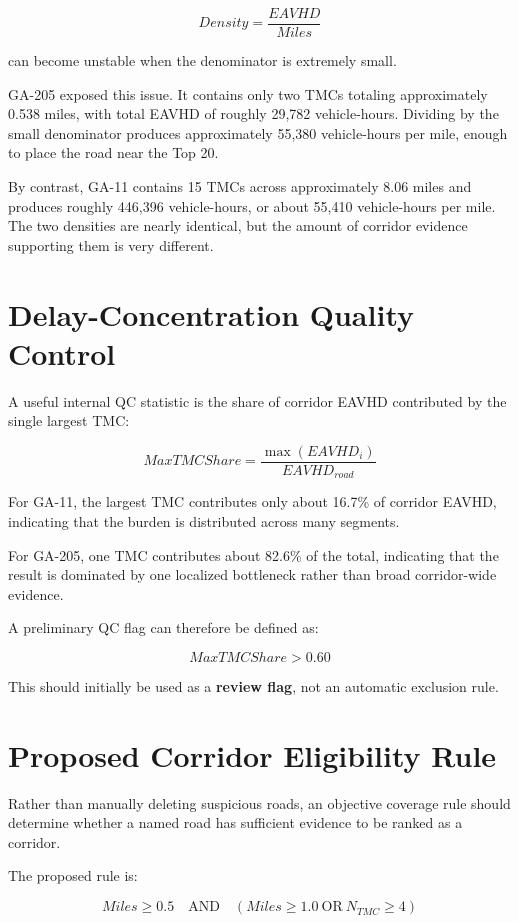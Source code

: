 \documentclass[11pt]{article}
\begin{document}
\[
Density = \frac{EAVHD}{Miles}
\]

can become unstable when the denominator is extremely small.

GA-205 exposed this issue. It contains only two TMCs totaling approximately 0.538 miles, with total EAVHD of roughly 29,782 vehicle-hours. Dividing by the small denominator produces approximately 55,380 vehicle-hours per mile, enough to place the road near the Top 20.

By contrast, GA-11 contains 15 TMCs across approximately 8.06 miles and produces roughly 446,396 vehicle-hours, or about 55,410 vehicle-hours per mile. The two densities are nearly identical, but the amount of corridor evidence supporting them is very different.

\section{Delay-Concentration Quality Control}

A useful internal QC statistic is the share of corridor EAVHD contributed by the single largest TMC:

\[
\boxed{
MaxTMCShare = \frac{\max(EAVHD_i)}{EAVHD_{road}}
}
\]

For GA-11, the largest TMC contributes only about 16.7\% of corridor EAVHD, indicating that the burden is distributed across many segments.

For GA-205, one TMC contributes about 82.6\% of the total, indicating that the result is dominated by one localized bottleneck rather than broad corridor-wide evidence.

A preliminary QC flag can therefore be defined as:

\[
\boxed{MaxTMCShare > 0.60}
\]

This should initially be used as a \textbf{review flag}, not an automatic exclusion rule.

\section{Proposed Corridor Eligibility Rule}

Rather than manually deleting suspicious roads, an objective coverage rule should determine whether a named road has sufficient evidence to be ranked as a corridor.

The proposed rule is:

\[
\boxed{
Miles \ge 0.5
\quad \text{AND} \quad
(Miles \ge 1.0\ \text{OR}\ N_{TMC}\ge4)
}
\]
\end{document}
